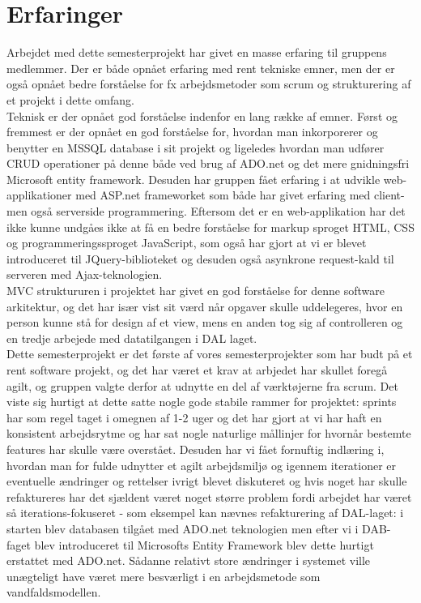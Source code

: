 \section{Erfaringer}
Arbejdet med dette semesterprojekt har givet en masse erfaring til gruppens medlemmer. Der er både opnået erfaring med rent tekniske emner, men der er også opnået bedre forståelse for fx arbejdsmetoder som scrum og strukturering af et projekt i dette omfang.\\
Teknisk er der opnået god forståelse indenfor en lang række af emner. Først og fremmest er der opnået en god forståelse for, hvordan man inkorporerer og benytter en MSSQL database i sit projekt og ligeledes hvordan man udfører CRUD operationer på denne både ved brug af ADO.net og det mere gnidningsfri Microsoft entity framework. Desuden har gruppen fået erfaring i at udvikle web-applikationer med ASP.net frameworket som både har givet erfaring med client- men også serverside programmering. Eftersom det er en web-applikation har det ikke kunne undgåes ikke at få en bedre forståelse for markup sproget HTML, CSS og programmeringssproget JavaScript, som også har gjort at vi er blevet introduceret til JQuery-biblioteket og desuden også asynkrone request-kald til serveren med Ajax-teknologien.\\
MVC struktururen i projektet har givet en god forståelse for denne software arkitektur, og det har især vist sit værd når opgaver skulle uddelegeres, hvor en person kunne stå for design af et view, mens en anden tog sig af controlleren og en tredje arbejede med datatilgangen i DAL laget. 
\\
Dette semesterprojekt er det første af vores semesterprojekter som har budt på et rent software projekt, og det har været et krav at arbjedet har skullet foregå agilt, og gruppen valgte derfor at udnytte en del af værktøjerne fra scrum. Det viste sig hurtigt at dette satte nogle gode stabile rammer for projektet: sprints har som regel taget i omegnen af 1-2 uger og det har gjort at vi har haft en konsistent arbejdsrytme og har sat nogle naturlige mållinjer for hvornår bestemte features har skulle være overstået. Desuden har vi fået fornuftig indlæring i, hvordan man for fulde udnytter et agilt arbejdsmiljø og igennem iterationer er eventuelle ændringer og rettelser ivrigt blevet diskuteret og hvis noget har skulle refaktureres har det sjældent været noget større problem fordi arbejdet har været så iterations-fokuseret - som eksempel kan nævnes refakturering af DAL-laget: i starten blev databasen tilgået med ADO.net teknologien men efter vi i DAB-faget blev introduceret til Microsofts Entity Framework blev dette hurtigt erstattet med ADO.net. Sådanne relativt store ændringer i systemet ville unægteligt have været mere besværligt i en arbejdsmetode som vandfaldsmodellen. \\

